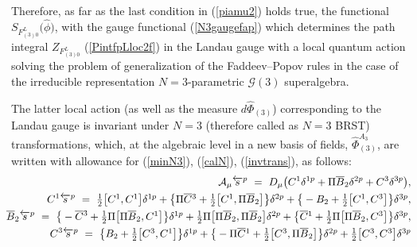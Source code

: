 \documentclass[10pt]{article}
\begin{document}
Therefore, as far as the last condition in (\ref{piamu2}) holds true, the functional
$S_{F^L_{(3)0}}\big(\widehat{\phi}\big) $, with the gauge functional (\ref{N3gaugefap}) which
determines the path integral $
 {Z}_{{F}^L_{(3)0}}$ (\ref{PintfpLloc2f}) in the Landau gauge with a local quantum
action solving the problem of generalization of the Faddeev--Popov rules in the case
of the irreducible representation $N=3$-parametric $\mathcal{G}(3)$ superalgebra.

The latter local action (as well as the measure $d \widehat{\Phi}_{(3)}$) corresponding
to the Landau gauge is invariant under $N=3$   (therefore called as $N=3$ BRST)  transformations, which, at the  algebraic
level in a new basis of fields,  $\widehat{\Phi}^{A_3}_{(3)}$, are written with allowance for
(\ref{minN3}), (\ref{calN}), (\ref{invtrans}), as follows:
 \begin{eqnarray}
\hspace{-0.5em}&\hspace{-0.5em}& \hspace{-0.5em}  \mathcal{A}_\mu  \overleftarrow{s}{}^p   \ = \ D_\mu \big(C^1 \delta^{1p}+ \Pi \overline{B}_2  \delta^{2p}+ C^3\delta^{3p}\big), \label{N3Afin}\\
\hspace{-0.5em}&\hspace{-0.5em}& \hspace{-0.5em}  C^1 \overleftarrow{s}{}^p   \ = \ \textstyle\frac{1}{2}\big[C^{1}, C^{1}\big]\delta^{1p} + \big\{\Pi \overline{C}{}^{3}+\frac{1}{2}\big[C^{1}, \Pi \overline{B}_{2}\big] \big\}\delta^{2p}+\big\{ -B_2+\textstyle\frac{1}{2}\big[C^{1}, C^{3}\big]  \big\}\delta^{3p}  %
 , \nonumber\\
  \hspace{-0.5em}&\hspace{-0.5em}& \hspace{-0.5em}  \overline{B}_2 \overleftarrow{s}{}^p   \ = \ \big\{-\overline{C}{}^3+\textstyle\frac{1}{2}\Pi\big[\Pi \overline{B}{}_2, C^{1}\big]\big\} \delta^{1p} + \frac{1}{2}\Pi\big[\Pi \overline{B}_2, \Pi \overline{B}_{2}\big] \delta^{2p} +\big\{ \overline{C}{}^1+\frac{1}{2}\Pi\big[\Pi \overline{B}_2, C^{3}\big]  \big\}\delta^{3p}  %
 , \label{N3Cfin}\\
       \hspace{-0.5em}&\hspace{-0.5em}& \hspace{-0.5em} C^3 \overleftarrow{s}{}^p   \ = \ \big\{ B_2 +\textstyle\frac{1}{2}\big[C^{3}, C^{1}\big]\big\}\delta^{1p} + \big\{-\Pi \overline{C}{}^{1}+\frac{1}{2}\big[C^{3}, \Pi \overline{B}_{2}\big] \big\}\delta^{2p}+\frac{1}{2}\big[C^{3}, C^{3}\big] \delta^{3p}  %

\end{eqnarray}
\end{document}
